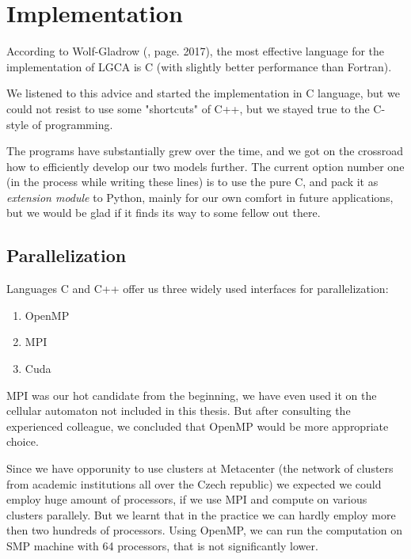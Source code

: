 \chapter{Implementation}

According to Wolf-Gladrow (\cite{wolf}, page. 2017), the most effective language for the implementation of LGCA is C (with slightly better performance than Fortran).

\bigskip

We listened to this advice and started the implementation in C language, but we could not resist to use some "shortcuts" of C++, but we stayed true to the C-style of programming.

\bigskip

The programs have substantially grew over the time, and we got on the crossroad how to efficiently develop our two models further. The current option number one (in the process while writing these lines) is to use the pure C, and pack it as \textit{extension module} to Python, mainly for our own comfort in future applications, but we would be glad if it finds its way to some fellow out there.

\section{Parallelization}
Languages C and C++ offer us three widely used interfaces for parallelization:
\begin{enumerate}
\item OpenMP
\item MPI
\item Cuda
\end{enumerate}
%

\bigskip

MPI was our hot candidate from the beginning, we have even used it on the cellular automaton not included in this thesis. But after consulting the experienced colleague, we concluded that OpenMP would be more appropriate choice.

Since we have opporunity to use clusters at Metacenter (the network of clusters from academic institutions all over the Czech republic) we expected we could employ huge amount of processors, if we use MPI and compute on various clusters parallely. But we learnt that in the practice we can hardly employ more then two hundreds of processors.
Using OpenMP, we can run the computation on SMP machine with 64 processors, that is not significantly lower.

